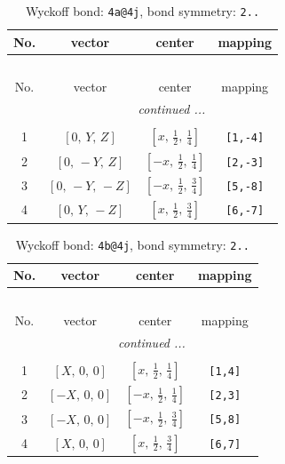 \documentclass[fleqn,8pt]{jsarticle}
\begin{document}
\begin{longtable}{cccc}
\caption{Wyckoff bond: {\tt 4a@4j}, bond symmetry: {\tt 2..}}
 \\
 \hline \hline
No. & vector & center & mapping \\ \hline \endfirsthead

\multicolumn{3}{l}{\tablename\ \thetable{}} \\
 \hline \hline
No. & vector & center & mapping \\ \hline \endhead

 \hline \hline
\multicolumn{3}{r}{\footnotesize\it continued ...} \\ \endfoot

 \hline \hline
\multicolumn{3}{r}{} \\ \endlastfoot

1 & $\left[ 0,\, Y,\, Z \right]$ & $\left[ x,\, \frac{1}{2},\, \frac{1}{4} \right]$ & {\tt [1,-4]} \\ \hline
2 & $\left[ 0,\, - Y,\, Z \right]$ & $\left[ - x,\, \frac{1}{2},\, \frac{1}{4} \right]$ & {\tt [2,-3]} \\ \hline
3 & $\left[ 0,\, - Y,\, - Z \right]$ & $\left[ - x,\, \frac{1}{2},\, \frac{3}{4} \right]$ & {\tt [5,-8]} \\ \hline
4 & $\left[ 0,\, Y,\, - Z \right]$ & $\left[ x,\, \frac{1}{2},\, \frac{3}{4} \right]$ & {\tt [6,-7]} \\
\end{longtable}
\renewcommand{\arraystretch}{1.2}
\begin{longtable}{cccc}
\caption{Wyckoff bond: {\tt 4b@4j}, bond symmetry: {\tt 2..}}
 \\
 \hline \hline
No. & vector & center & mapping \\ \hline \endfirsthead

\multicolumn{3}{l}{\tablename\ \thetable{}} \\
 \hline \hline
No. & vector & center & mapping \\ \hline \endhead

 \hline \hline
\multicolumn{3}{r}{\footnotesize\it continued ...} \\ \endfoot

 \hline \hline
\multicolumn{3}{r}{} \\ \endlastfoot

1 & $\left[ X,\, 0,\, 0 \right]$ & $\left[ x,\, \frac{1}{2},\, \frac{1}{4} \right]$ & {\tt [1,4]} \\ \hline
2 & $\left[ - X,\, 0,\, 0 \right]$ & $\left[ - x,\, \frac{1}{2},\, \frac{1}{4} \right]$ & {\tt [2,3]} \\ \hline
3 & $\left[ - X,\, 0,\, 0 \right]$ & $\left[ - x,\, \frac{1}{2},\, \frac{3}{4} \right]$ & {\tt [5,8]} \\ \hline
4 & $\left[ X,\, 0,\, 0 \right]$ & $\left[ x,\, \frac{1}{2},\, \frac{3}{4} \right]$ & {\tt [6,7]} \\
\end{longtable}
\end{document}
